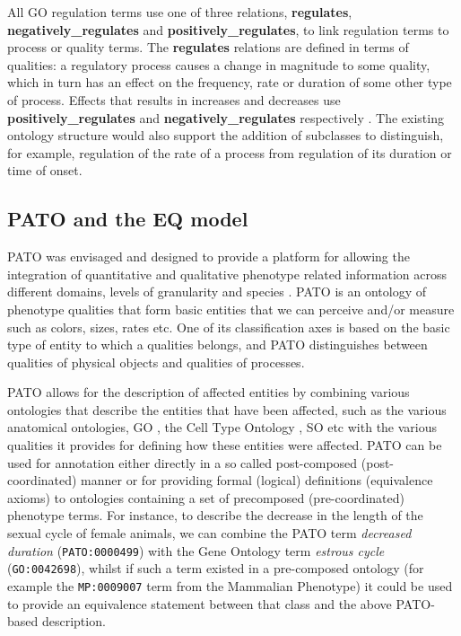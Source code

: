 \documentclass{bioinfo}
\renewcommand{\cite}{\citep}
\begin{document}
\begin{methods}
All GO regulation terms use one of three relations, {\bf regulates},
{\bf negatively\_regulates} and {\bf positively\_regulates}, to link
regulation terms to process or quality terms. The {\bf regulates}
relations are defined in terms of qualities: a regulatory process
causes a change in magnitude to some quality, which in turn has an
effect on the frequency, rate or duration of some other type of
process. Effects that results in increases and decreases use {\bf
  positively\_regulates} and {\bf negatively\_regulates} respectively
\cite{Mungall2010go}. The existing ontology structure would also
support the addition of subclasses to distinguish, for example,
regulation of the rate of a process from regulation of its duration or
time of onset.

\subsection{PATO and the EQ model}
PATO was envisaged and designed to provide a platform for allowing the
integration of quantitative and qualitative phenotype related
information across different domains, levels of granularity and
species \cite{Gkoutos2005}.  PATO is an ontology of phenotype
qualities that form basic entities that we can perceive and/or measure
such as colors, sizes, rates etc. One of its classification axes is
based on the basic type of entity to which a qualities belongs, and
PATO distinguishes between qualities of physical objects and qualities
of processes.

PATO allows for the description of affected entities by combining
various ontologies that describe the entities that have been affected,
such as the various anatomical ontologies, GO \cite {Ashburner2000short},
the Cell Type Ontology \cite {Bard2005}, SO \cite {Eilbeck2005} etc
with the various qualities it provides for defining how these entities
were affected.  PATO can be used for annotation either directly in a
so called post-composed (post-coordinated) manner or for providing
formal (logical) definitions (equivalence axioms) to ontologies
containing a set of precomposed (pre-coordinated) phenotype terms. For
instance, to describe the decrease in the length of the sexual cycle
of female animals, we can combine the PATO term \textit{decreased
  duration} ({\tt PATO:0000499}) with the Gene Ontology term
\textit{estrous cycle} ({\tt GO:0042698}), whilst if such a term
existed in a pre-composed ontology (for example the {\tt MP:0009007}
term from the Mammalian Phenotype) it could be used to provide an
equivalence statement between that class and the above PATO-based
description.


\end{methods}
\end{document}
